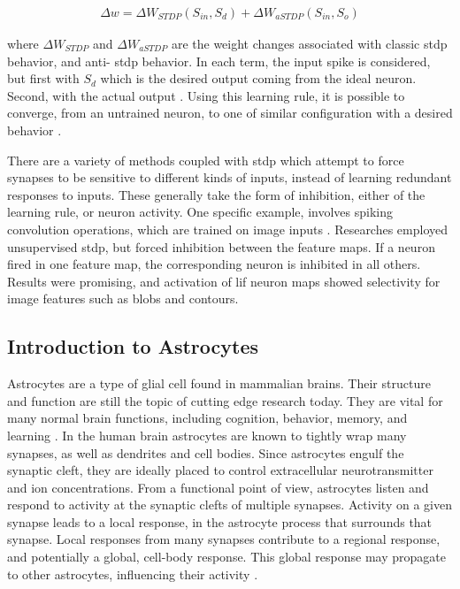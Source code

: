 \documentclass[conference]{IEEEtran}
\newcommand{\eq}[1]{Equation (\ref{#1})}
\begin{document}
\begin{align}
  \Delta w = \Delta W_{STDP}(S_{in}, S_{d}) + \Delta W_{aSTDP}(S_{in}, S_{o}) \label{eq:resume_stdp}
\end{align}

\noindent where $\Delta W_{STDP}$ and $\Delta W_{aSTDP}$ are the weight changes
associated with classic \gls{stdp} behavior, and anti- \gls{stdp} behavior. In
each term, the input spike is considered, but first with $S_{d}$ which is the
desired output coming from the ideal neuron. Second, with the actual output
\parencite{mozafari_2018}. Using this learning rule, it is possible to converge,
from an untrained neuron, to one of similar configuration with a desired
behavior \parencite{ponulak_2010}.


There are a variety of methods coupled with \gls{stdp} which attempt to force
synapses to be sensitive to different kinds of inputs, instead of learning
redundant responses to inputs. These generally take the form of inhibition,
either of the learning rule, or neuron activity. One specific example, involves
spiking convolution operations, which are trained on image inputs
\parencite{delorme_2001}. Researches employed unsupervised \gls{stdp}, but
forced inhibition between the feature maps. If a neuron fired in one feature
map, the corresponding neuron is inhibited in all others. Results were
promising, and activation of \gls{lif} neuron maps showed selectivity for image
features such as blobs and contours.

\subsection{Introduction to Astrocytes}
Astrocytes are a type of glial cell found in mammalian brains. Their
structure and function are still the topic of cutting edge research
today. They are vital for many normal brain functions, including
cognition, behavior, memory, and learning \parencite{mederos_2018}. In the human
brain astrocytes are known to tightly wrap many synapses, as well as dendrites and cell
bodies. Since astrocytes engulf the synaptic cleft, they are ideally
placed to control extracellular neurotransmitter and ion
concentrations. From a functional point of view, astrocytes listen and
respond to activity at the synaptic clefts of multiple synapses. Activity on
a given synapse leads to a local response, in the astrocyte process that
surrounds that synapse. Local responses from many synapses contribute to a
regional response, and potentially a global, cell-body response. This global
response may propagate to other astrocytes, influencing their activity
\parencite{min_2012}.
\end{document}
